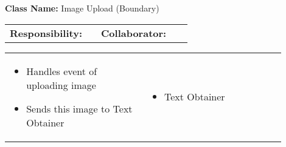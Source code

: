 \begin{cards}[]
    \textbf{Class Name:} Image Upload (Boundary)
    \tcbline
    \begin{tabular}{p{0.45\linewidth} | p{0.45\linewidth}}
        \textbf{Responsibility:}& 
        \textbf{Collaborator:}\\
    \end{tabular}
    \tcbline
    \begin{tabular}{p{0.45\linewidth} | p{0.45\linewidth}}
        \begin{itemize}
            \item Handles event of uploading image
            \item Sends this image to Text Obtainer
            
        \end{itemize}
        &
        \begin{itemize}
            \item Text Obtainer
        \end{itemize}
    \end{tabular}
\end{cards}